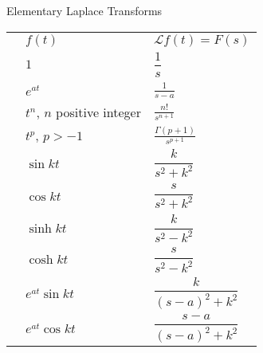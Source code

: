 \documentclass[12pt]{exam}
\begin{document}
    


\newpage

\begin{center}
\begin{large}
Elementary Laplace Transforms
\end{large}
\end{center}

\newcommand{\LTNUM}{\stepcounter{NumberInTable}{(\theNumberInTable)}}

\vspace{-2ex}
    \renewcommand{\arraystretch}{2.5}
    \begin{center}
    \begin{tabular}{ p{1cm} p{5cm} p{4.8cm} }
        & $f(t)$ & $\mathcal L{f(t)}=F(s)$ \\ 
        \LTNUM & $1$ & $\displaystyle \dfrac{1}{s}$  \\ 
        \LTNUM & $e^{at}$	& $\displaystyle \frac{1}{s-a}$ \\ 
        \LTNUM & $t^n$, $n$ positive integer	& $\displaystyle \frac{n!}{s^{n+1}}$  \\ 
        \LTNUM & $t^p$, $p > -1$	& $\displaystyle \frac{\Gamma(p+1)}{s^{p+1}}$  \\ 
        \LTNUM &$\sin kt$ 	& $\displaystyle \dfrac{k}{s^2+k^2}$ \\ 
        \LTNUM &$\cos kt$ 	& $\displaystyle \dfrac{s}{s^2+k^2}$ \\ 
        \LTNUM &$\sinh kt$	& $\displaystyle \dfrac{k}{s^2-k^2}$ \\ 
        \LTNUM &$\cosh kt$	& $\displaystyle \dfrac{s}{s^2-k^2}$ \\ 
        \LTNUM &$e^{at}\sin kt$	& $\displaystyle \dfrac{k}{(s-a)^2+k^2}$   \\ 
        \LTNUM &$e^{at}\cos kt$	& $\displaystyle \dfrac{s-a}{(s-a)^2+k^2}$  \\ 
    \end{tabular}
\end{center}

\newpage 
\end{document}
